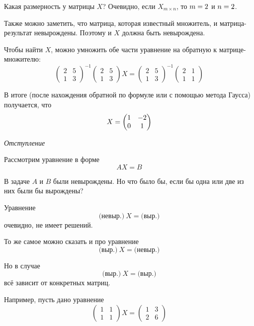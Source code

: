 \documentclass[a4paper,12pt]{article}
\begin{document}
  \begin{solution}
    Какая размерность у матрицы $X$?
    Очевидно, если $X_{m\times n}$, то $m \hm= 2$ и $n \hm= 2$.
    
    Также можно заметить, что матрица, которая известный множитель, и матрица-результат невырождены.
    Поэтому и $X$ должна быть невырождена.
    
    Чтобы найти $X$, можно умножить обе части уравнение на обратную к матрице-множителю:
    \[
    \begin{pmatrix}
      2 & 5\\
      1 & 3
    \end{pmatrix}^{-1}
    \begin{pmatrix}
      2 & 5\\
      1 & 3
    \end{pmatrix} X = \begin{pmatrix}
      2 & 5\\
      1 & 3
    \end{pmatrix}^{-1}
    \begin{pmatrix}
      2 & 1\\
      1 & 1
    \end{pmatrix}
  \]
  
  В итоге (после нахождения обратной по формуле или с помощью метода Гаусса) получается, что
  \[
    X \hm= \begin{pmatrix}
      1 & -2\\
      0 & 1
    \end{pmatrix}
  \]
  \end{solution}
  
  \bigskip
  
  \emph{Отступление}
  
  Рассмотрим уравнение в форме
  \[
    AX = B
  \]
  
  В задаче $A$ и $B$ были невырождены.
  Но что было бы, если бы одна или две из них были бы вырождены?
  
  Уравнение
  \[
    \mbox{(невыр.)}\ X = \mbox{(выр.)}
  \]
  очевидно, не имеет решений.
  
  То же самое можно сказать и про уравнение
  \[
    \mbox{(выр.)}\ X = \mbox{(невыр.)}
  \]
  
  Но в случае
  \[
    \mbox{(выр.)}\ X = \mbox{(выр.)}
  \]
  всё зависит от конкретных матриц.
  
  Например, пусть дано уравнение
  \[
    \begin{pmatrix}
      1 & 1\\
      1 & 1
    \end{pmatrix} X = \begin{pmatrix}
      1 & 3\\
      2 & 6
    \end{pmatrix}
  \]
  
\end{document}
